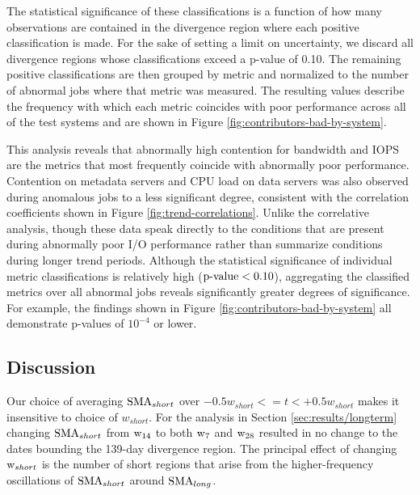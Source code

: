 The statistical significance of these classifications is a function of how many observations are contained in the divergence region where each positive classification is made.
For the sake of setting a limit on uncertainty, we discard all divergence regions whose classifications exceed a p-value of 0.10.
The remaining positive classifications are then grouped by metric and normalized to the number of abnormal jobs where that metric was measured.
The resulting values describe the frequency with which each metric coincides with poor performance across all of the test systems and are shown in Figure \ref{fig:contributors-bad-by-system}.

This analysis reveals that abnormally high contention for bandwidth and IOPS are the metrics that most frequently coincide with abnormally poor performance.
Contention on metadata servers and CPU load on data servers was also observed during anomalous jobs to a less significant degree, consistent with the correlation coefficients shown in Figure \ref{fig:trend-correlations}.
Unlike the correlative analysis, though these data speak directly to the conditions that are present during abnormally poor I/O performance rather than summarize conditions during longer trend periods.
Although the statistical significance of individual metric classifications is relatively high (${\textup{p-value} < 0.10}$), aggregating the classified metrics over all abnormal jobs reveals significantly greater degrees of significance.
For example, the findings shown in Figure \ref{fig:contributors-bad-by-system} all demonstrate p-values of $10^{-4}$ or lower.

\subsection {Discussion}
\label{sec:results/discussion}


Our choice of averaging $\textup{SMA}_{short}$ over ${-0.5w_{short} <= t < +0.5w_{short}}$ makes it insensitive to choice of $w_{short}$.
For the analysis in Section \ref{sec:results/longterm} changing $\textup{SMA}_{short}$ from $\textup{w}_{14}$ to both $\textup{w}_{7}$ and $\textup{w}_{28}$ resulted in no change to the dates bounding the 139-day divergence region.
The principal effect of changing $\textup{w}_{short}$ is the number of short regions that arise from the higher-frequency oscillations of $\textup{SMA}_{short}$ around $\textup{SMA}_{long}$.

